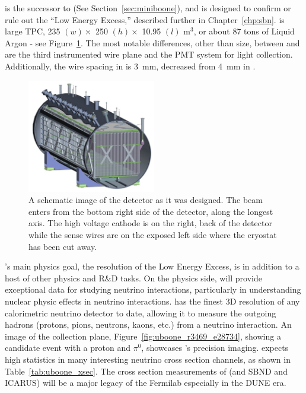 \uboone \cite{Chen:2007ae} is the successor to \MB \cite{AguilarArevalo:2008qa} (See Section~\ref{sec:miniboone}), and is designed to confirm or rule out the \MB ``Low Energy Excess,'' described further in Chapter~\ref{chp:sbn}.  \uboone is large TPC, 235 $ (w) \times $ 250 $ (h) \times $ 10.95 $ (l) $ m$^3$, or about 87 tons of Liquid Argon - see Figure~\ref{fig:uboone_det}.  The most notable differences, other than size, between \argoneut and \uboone are the third instrumented wire plane and the PMT system for light collection.  Additionally, the wire spacing in \uboone is 3~mm, decreased from 4~mm in \argoneut.

\begin{figure}[htb]
  \centering
  \includegraphics[width=0.5\textwidth]{lartpc_figures/uboone_tpc.jpg}
  \caption[\uboone Detector Design]{A schematic image of the \uboone detector as it was designed.  The beam enters from the bottom right side of the detector, along the longest axis.  The high voltage cathode is on the right, back of the detector while the sense wires are on the exposed left side where the cryostat has been cut away.}
  \label{fig:uboone_det}
\end{figure}

\uboone's main physics goal, the resolution of the Low Energy Excess, is in addition to a host of other physics and R\&D tasks.  On the physics side, \uboone will provide exceptional data for studying neutrino interactions, particularly in understanding nuclear physic effects in neutrino interactions.  \uboone has the finest 3D resolution of any calorimetric neutrino detector to date, allowing it to measure the outgoing hadrons (protons, pions, neutrons, kaons, etc.) from a neutrino interaction.  An image of the \uboone collection plane, Figure~\ref{fig:uboone_r3469_e28734}, showing a \numu candidate event with a proton and $\pi^0$, showcases \uboone's precision imaging.  \uboone expects high statistics in many interesting neutrino cross section channels, as shown in Table~\ref{tab:uboone_xsec}.  The cross section measurements of \uboone (and SBND and ICARUS) will be a major legacy of the Fermilab \lartpcs especially in the DUNE\cite{DUNE} era.


